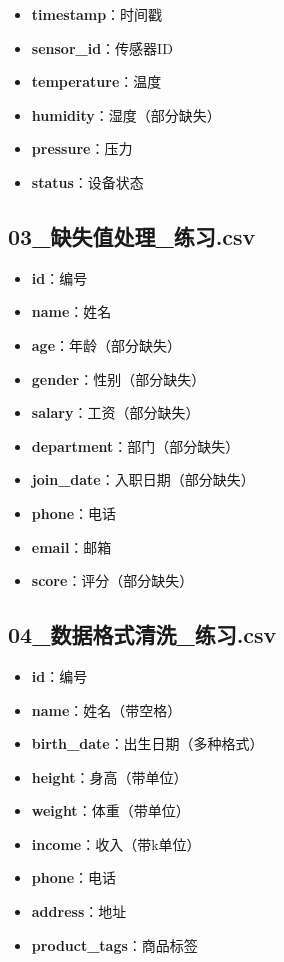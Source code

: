 \documentclass[12pt,a4paper]{article}
\begin{document}
\begin{knowledgebox}[数据字段说明]
\begin{itemize}
    \item \textbf{timestamp}：时间戳
    \item \textbf{sensor\_id}：传感器ID
    \item \textbf{temperature}：温度
    \item \textbf{humidity}：湿度（部分缺失）
    \item \textbf{pressure}：压力
    \item \textbf{status}：设备状态
\end{itemize}
\end{knowledgebox}

\subsection{03\_缺失值处理\_练习.csv}

\begin{knowledgebox}[数据字段说明]
\begin{itemize}
    \item \textbf{id}：编号
    \item \textbf{name}：姓名
    \item \textbf{age}：年龄（部分缺失）
    \item \textbf{gender}：性别（部分缺失）
    \item \textbf{salary}：工资（部分缺失）
    \item \textbf{department}：部门（部分缺失）
    \item \textbf{join\_date}：入职日期（部分缺失）
    \item \textbf{phone}：电话
    \item \textbf{email}：邮箱
    \item \textbf{score}：评分（部分缺失）
\end{itemize}
\end{knowledgebox}

\subsection{04\_数据格式清洗\_练习.csv}

\begin{knowledgebox}[数据字段说明]
\begin{itemize}
    \item \textbf{id}：编号
    \item \textbf{name}：姓名（带空格）
    \item \textbf{birth\_date}：出生日期（多种格式）
    \item \textbf{height}：身高（带单位）
    \item \textbf{weight}：体重（带单位）
    \item \textbf{income}：收入（带k单位）
    \item \textbf{phone}：电话
    \item \textbf{address}：地址
    \item \textbf{product\_tags}：商品标签
\end{itemize}
\end{knowledgebox}
\end{document}
